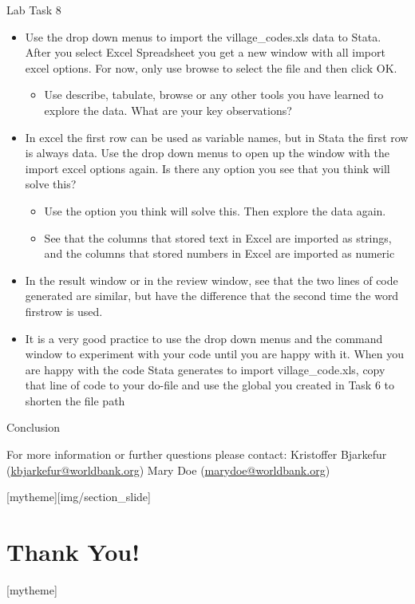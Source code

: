 \documentclass[aspectratio=169]{beamer}
\newcommand{\sectionpic}[2]{
	\setbeamertemplate{section page}[mytheme][#2]
	\section{#1}
	\setbeamertemplate{section page}[mytheme]
}
\begin{document}
\begin{frame}{Lab Task 8}
\begin{itemize}
	\item Use the drop down menus to import the village\_codes.xls data to Stata. After you select Excel Spreadsheet you get a new window with all import excel options. For now, only use browse to select the file and then click OK.
		\begin{itemize}
			\item Use describe, tabulate, browse or any other tools you have learned to explore the data. What are your key observations?
		\end{itemize}
	\item In excel the first row can be used as variable names, but in Stata the first row is always data. Use the drop down menus to open up the window with the import excel options again. Is there any option you see that you think will solve this?
		\begin{itemize}
			\item Use the option you think will solve this. Then explore the data again.
			\item See that the columns that stored text in Excel are imported as strings, and the columns that stored numbers in Excel are imported as numeric
		\end{itemize}	 
	\item In the result window or in the review window, see that the two lines of code generated are similar, but have the difference that the second time the word firstrow is used. 
	\item It is a very good practice to use the drop down menus and the command window to experiment with your code until you are happy with it. When you are happy with the code Stata generates to import village\_code.xls, copy that line of code to your do-file and use the global you created in Task 6 to shorten the file path
\end{itemize}
\end{frame}

\begin{frame}{Conclusion}


\vspace{20mm}
For more information or further questions please contact:
\newline Kristoffer Bjarkefur (\url{kbjarkefur@worldbank.org}) \newline Mary Doe (\url{marydoe@worldbank.org})

\end{frame}

\sectionpic{Thank You!}{img/section_slide}
\end{document}
